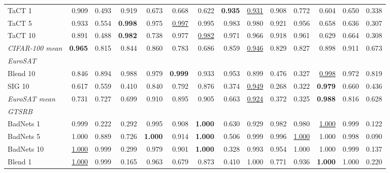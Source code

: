 \begin{table}[htbp]
\begin{adjustbox}{max width=\textwidth}
\begin{tabular}{lrrrrrrrrrrrrr}
TaCT 1 & 0.909 & \textcolor{black!45}{0.493} & 0.919 & 0.673 & 0.668 & 0.622 & \textbf{0.935} & \underline{0.931} & 0.908 & 0.772 & 0.604 & 0.650 & \textcolor{black!45}{0.338} \\
TaCT 5 & 0.933 & 0.554 & \textbf{0.998} & 0.975 & \underline{0.997} & 0.995 & 0.983 & 0.980 & 0.921 & 0.956 & 0.658 & 0.636 & \textcolor{black!45}{0.307} \\
TaCT 10 & 0.891 & \textcolor{black!45}{0.488} & \textbf{0.982} & 0.738 & 0.977 & \underline{0.982} & 0.971 & 0.966 & 0.918 & 0.961 & 0.629 & 0.664 & \textcolor{black!45}{0.308} \\
\rowcolor{black!8}\emph{CIFAR-100 mean} & \textbf{0.965} & 0.815 & 0.844 & 0.860 & 0.783 & 0.686 & 0.859 & \underline{0.946} & 0.829 & 0.827 & 0.898 & 0.911 & 0.673 \\
\multicolumn{14}{l}{\emph{EuroSAT}} \\
Blend 10 & 0.846 & 0.894 & 0.988 & 0.979 & \textbf{0.999} & 0.933 & 0.953 & 0.899 & \textcolor{black!45}{0.476} & \textcolor{black!45}{0.327} & \underline{0.998} & 0.972 & 0.819 \\
SIG 10 & 0.617 & 0.559 & \textcolor{black!45}{0.410} & 0.840 & 0.792 & 0.876 & \textcolor{black!45}{0.374} & \underline{0.949} & \textcolor{black!45}{0.268} & \textcolor{black!45}{0.322} & \textbf{0.979} & 0.660 & \textcolor{black!45}{0.436} \\
\rowcolor{black!8}\emph{EuroSAT mean} & 0.731 & 0.727 & 0.699 & 0.910 & 0.895 & 0.905 & 0.663 & \underline{0.924} & \textcolor{black!45}{0.372} & \textcolor{black!45}{0.325} & \textbf{0.988} & 0.816 & 0.628 \\
\multicolumn{14}{l}{\emph{GTSRB}} \\
BadNets 1 & 0.999 & \textcolor{black!45}{0.222} & \textcolor{black!45}{0.292} & 0.995 & 0.908 & \textbf{1.000} & 0.630 & 0.929 & 0.982 & 0.980 & \underline{1.000} & 0.999 & \textcolor{black!45}{0.122} \\
BadNets 5 & 1.000 & 0.889 & 0.726 & \textbf{1.000} & 0.914 & \textbf{1.000} & 0.506 & 0.999 & 0.996 & \underline{1.000} & 1.000 & 0.998 & \textcolor{black!45}{0.090} \\
BadNets 10 & \underline{1.000} & 0.999 & \textcolor{black!45}{0.299} & 0.979 & 0.901 & \textbf{1.000} & \textcolor{black!45}{0.328} & 0.993 & 0.954 & 1.000 & 1.000 & 0.999 & \textcolor{black!45}{0.137} \\
Blend 1 & \underline{1.000} & 0.999 & \textcolor{black!45}{0.165} & 0.963 & 0.679 & 0.873 & \textcolor{black!45}{0.410} & 1.000 & 0.771 & 0.936 & \textbf{1.000} & 1.000 & \textcolor{black!45}{0.220} \\

\end{tabular}
\end{adjustbox}
\end{table}

